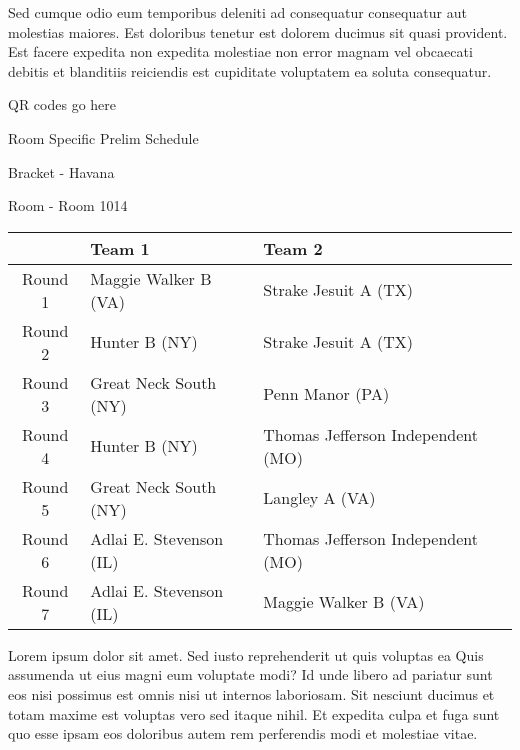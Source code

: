 \documentclass{article}%
\begin{document}
\newline%
Sed cumque odio eum temporibus deleniti ad consequatur consequatur aut molestias maiores. Est doloribus tenetur est dolorem ducimus sit quasi provident. Est facere expedita non expedita molestiae non error magnam vel obcaecati debitis et blanditiis reiciendis est cupiditate voluptatem ea soluta consequatur.%
\vspace*{140pt}%
\begin{center}%
\begin{Huge}%
QR codes go here%
\end{Huge}%
\end{center}%
\newpage%
\begin{center}%
\begin{Huge}%
Room Specific Prelim Schedule%
\end{Huge}%
\vspace*{8pt}%
\linebreak%
\begin{Large}%
Bracket {-} Havana%
\end{Large}%
\vspace*{8pt}%
\linebreak%
\vspace*{8pt}%
\begin{Large}%
Room {-} Room 1014%
\end{Large}%
\end{center}%
%
\begin{tabularx}{\textwidth}{|c|Y|Y|}%
\hline%
&Team 1&Team 2\\%
\hline%
Round 1&Maggie Walker B (VA)&Strake Jesuit A (TX)\\%
Round 2&Hunter B (NY)&Strake Jesuit A (TX)\\%
Round 3&Great Neck South (NY)&Penn Manor (PA)\\%
Round 4&Hunter B (NY)&Thomas Jefferson Independent (MO)\\%
Round 5&Great Neck South (NY)&Langley A (VA)\\%
Round 6&Adlai E. Stevenson (IL)&Thomas Jefferson Independent (MO)\\%
Round 7&Adlai E. Stevenson (IL)&Maggie Walker B (VA)\\%
\hline%
\end{tabularx}%
\vspace*{8pt}%
\newline%
Lorem ipsum dolor sit amet. Sed iusto reprehenderit ut quis voluptas ea Quis assumenda ut eius magni eum voluptate modi? Id unde libero ad pariatur sunt eos nisi possimus est omnis nisi ut internos laboriosam. Sit nesciunt ducimus et totam maxime est voluptas vero sed itaque nihil. Et expedita culpa et fuga sunt quo esse ipsam eos doloribus autem rem perferendis modi et molestiae vitae.\newline%
\end{document}
